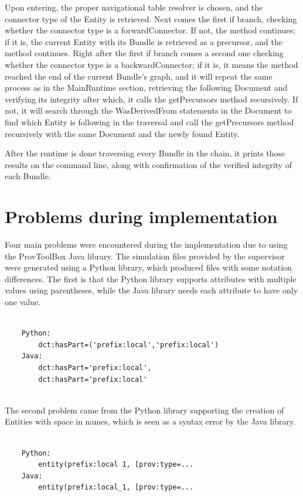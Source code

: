 \documentclass[
  digital,     %
  oneside,     %
  nosansbold,  %
  nocolorbold, %
  lof,         %
  lot,         %
]{fithesis4}
\begin{document}
Upon entering, the proper navigational table resolver is chosen, and the connector type of the Entity is retrieved. Next comes the first if branch, checking whether the connector type is a forwardConnector. If not, the method continues; if it is, the current Entity with its Bundle is retrieved as a precursor, and the method continues. Right after the first if branch comes a second one checking whether the connector type is a backwardConnector; if it is, it means the method reached the end of the current Bundle's graph, and it will repeat the same process as in the MainRuntime section, retrieving the following Document and verifying its integrity after which, it calls the getPrecursors method recursively. If not, it will search through the WasDerivedFrom statements in the Document to find which Entity is following in the traversal and call the getPrecursors method recursively with the same Document and the newly found Entity. 

After the runtime is done traversing every Bundle in the chain, it prints those results on the command line, along with confirmation of the verified integrity of each Bundle.

\section{Problems during implementation}
Four main problems were encountered during the implementation due to using the ProvToolBox Java library. The simulation files provided by the supervisor were generated using a Python library, which produced files with some notation differences. The first is that the Python library supports attributes with multiple values using parentheses, while the Java library needs each attribute to have only one value.

\begin{verbatim}

    Python: 
        dct:hasPart=('prefix:local','prefix:local')
    Java:
        dct:hasPart='prefix:local', 
        dct:hasPart='prefix:local' 
        
\end{verbatim}

The second problem came from the Python library supporting the creation of Entities with space in names, which is seen as a syntax error by the Java library.

\begin{verbatim}

    Python:
        entity(prefix:local 1, [prov:type=...
    Java:
        entity(prefix:local_1, [prov:type=... 
        
\end{verbatim}
\end{document}
